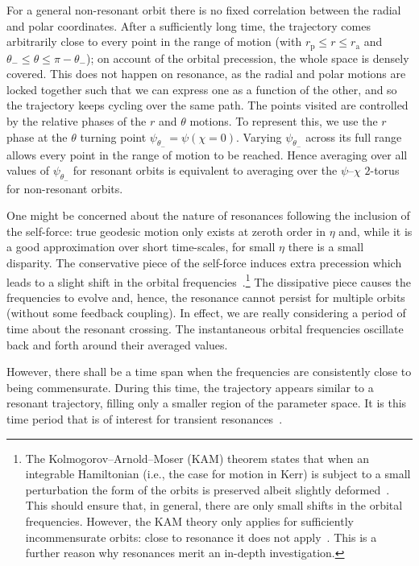 \documentclass[aps,prd,amsfonts,amssymb,amsmath,nofootinbib,reprint,showpacs,superscriptaddress,twocolumn]{revtex4}
\newcommand{\sub}[1]{\ensuremath{_\text{#1}}}
\begin{document}
For a general non-resonant orbit there is no fixed correlation between the radial and polar coordinates. After a sufficiently long time, the trajectory comes arbitrarily close to every point in the range of motion (with $r\sub{p} \leq r \leq r\sub{a}$ and $\theta_- \leq \theta \leq \pi - \theta_-$); on account of the orbital precession, the whole space is densely covered. This does not happen on resonance, as the radial and polar motions are locked together such that we can express one as a function of the other, and so the trajectory keeps cycling over the same path. The points visited are controlled by the relative phases of the $r$ and $\theta$ motions. To represent this, we use the $r$ phase at the $\theta$ turning point $\psi_{\theta_-} = \psi(\chi = 0)$. Varying $\psi_{\theta_-}$ across its full range allows every point in the range of motion to be reached. Hence averaging over all values of $\psi_{\theta_-}$ for resonant orbits is equivalent to averaging over the $\psi$--$\chi$ $2$-torus for non-resonant orbits.

One might be concerned about the nature of resonances following the inclusion of the self-force: true geodesic motion only exists at zeroth order in $\eta$ and, while it is a good approximation over short time-scales, for small $\eta$ there is a small disparity. The conservative piece of the self-force induces extra precession which leads to a slight shift in the orbital frequencies~\cite{Warburton2012}.\footnote{The Kolmogorov--Arnold--Moser (KAM) theorem states that when an integrable Hamiltonian (i.e., the case for motion in Kerr) is subject to a small perturbation the form of the orbits is preserved albeit slightly deformed~\cite{Arnold1963,Moser1973}. %
This should ensure that, in general, there are only small shifts in the orbital frequencies. However, the KAM theory only applies for sufficiently incommensurate orbits: close to resonance it does not apply~\cite{Moser1973}. %
This is a further reason why resonances merit an in-depth investigation.}
The dissipative piece causes the frequencies to evolve and, hence, the resonance cannot persist for multiple orbits (without some feedback coupling). In effect, we are really considering a period of time about the resonant crossing. The instantaneous orbital frequencies oscillate back and forth around their averaged values.

However, there shall be a time span when the frequencies are consistently close to being commensurate. During this time, the trajectory appears similar to a resonant trajectory, filling only a smaller region of the parameter space. It is this time period that is of interest for transient resonances~\cite{Bosley1992}.
\end{document}
